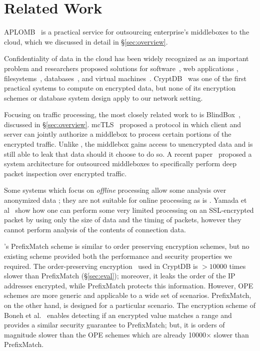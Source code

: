 
\section{Related Work}
\label{sec:related}

APLOMB~\cite{aplomb} is a practical service for outsourcing enterprise's middleboxes to the cloud, which we discussed in detail in \S\ref{sec:overview}.

Confidentiality of data in the cloud has been widely recognized as an important problem and researchers proposed solutions for software~\cite{Baumann:Haven}, web applications \cite{giffin:hails, Mylar},  filesystems~\cite{blaze:cfs, kallahalla:plutus, goh:sirius},  databases~\cite{popa:cryptdb, blindseer},  and virtual machines~\cite{Zhang:CloudVisor}. 
CryptDB~\cite{popa:cryptdb} was one of the first practical systems to compute on encrypted data, but none of its encryption schemes or database system design apply to our network setting. 

Focusing on traffic processing, the most closely related work to \sys is BlindBox~\cite{blindbox}, discussed in \S\ref{sec:overview}.  mcTLS~\cite{mctls} proposed a protocol in which client and server can jointly authorize a middlebox to process certain portions of the encrypted traffic. Unlike \sys, the middlebox  gains access to unencrypted data and is still able to leak that data should it choose to do so. A recent paper~\cite{secmb} proposed a system architecture for outsourced middleboxes to specifically perform deep packet inspection over encrypted traffic.

Some systems which focus on {\it offline} processing allow some analysis over anonymized data \cite{Vern:Anonymize06, Vern:Anonymize03}; they are not suitable for online processing as is \sys.
Yamada et al~\cite{Yamada_IDS} show how one can perform some very limited processing on an SSL-encrypted packet by using only the size of data and the timing of packets, however they cannot perform analysis of the contents of connection data.

\sys's PrefixMatch scheme is similar to order preserving encryption schemes, but no existing scheme provided both the performance and security properties we required.
The order-preserving encryption~\cite{boldyreva:ope, popa:mope} used in CryptDB is 
 $>10000$ times slower than PrefixMatch (\S\ref{sec:eval}); moreover, it leaks the order of the IP addresses encrypted, while PrefixMatch protects this information. However, OPE schemes are more generic and applicable to a wide set of scenarios. PrefixMatch, on the other hand, is designed for a particular scenario.
The encryption scheme of Boneh et al.~\cite{BonehRange} enables detecting if an encrypted value matches a range and provides a similar security guarantee to PrefixMatch; but, it is orders of magnitude slower than the OPE schemes which are already 10000$\times$ slower than PrefixMatch. 

